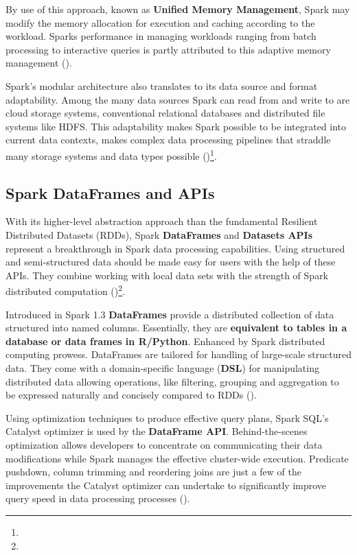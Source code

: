 By use of this approach, known as \textbf{Unified Memory Management}, Spark may modify the memory allocation for execution and caching according to the workload. Sparks performance in managing workloads ranging from batch processing to interactive queries is partly attributed to this adaptive memory management (\cite{Kona2023LeveragingSA})\footnotemark[16].

Spark's modular architecture also translates to its data source and format adaptability. Among the many data sources Spark can read from and write to are cloud storage systems, conventional relational databases and distributed file systems like HDFS. This adaptability makes Spark possible to be integrated into current data contexts, makes complex data processing pipelines that straddle many storage systems and data types possible (\cite{Kona2023LeveragingSA})\footnote[16]{}.

\subsection{Spark DataFrames and APIs}

With its higher-level abstraction approach than the fundamental Resilient Distributed Datasets (RDDs), Spark \textbf{DataFrames} and \textbf{Datasets APIs} represent a breakthrough in Spark data processing capabilities. Using structured and semi-structured data should be made easy for users with the help of these APIs. They combine working with local data sets with the strength of Spark distributed computation (\cite{Chambers2018SparkTD})\footnote[35]{}.

Introduced in Spark 1.3 \textbf{DataFrames} provide a distributed collection of data structured into named columns. Essentially, they are \textbf{equivalent to tables in a database or data frames in R/Python}. Enhanced by Spark distributed computing prowess. DataFrames are tailored for handling of large-scale structured data. They come with a domain-specific language (\textbf{DSL}) for manipulating distributed data allowing operations, like filtering, grouping and aggregation to be expressed naturally and concisely compared to RDDs (\cite{Chambers2018SparkTD})\footnotemark[35].

Using optimization techniques to produce effective query plans, Spark SQL's Catalyst optimizer is used by the \textbf{DataFrame API}. Behind-the-scenes optimization allows developers to concentrate on communicating their data modifications while Spark manages the effective cluster-wide execution. Predicate pushdown, column trimming and reordering joins are just a few of the improvements the Catalyst optimizer can undertake to significantly improve query speed in data processing processes (\cite{Chambers2018SparkTD})\footnotemark[35].

